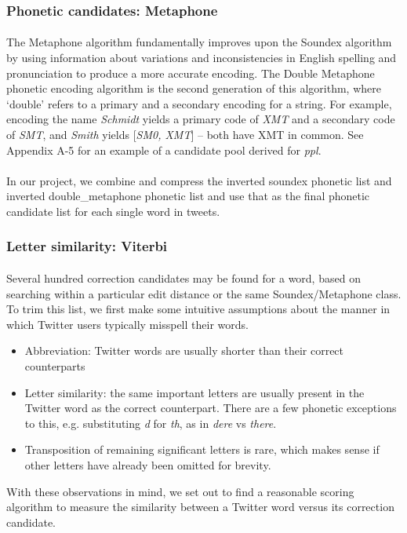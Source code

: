 \documentclass[twocolumn,10pt]{article}
\begin{document}
\subsubsection*{Phonetic candidates: Metaphone}
\paragraph{} The Metaphone algorithm fundamentally improves upon the Soundex algorithm by using information about variations and inconsistencies in English spelling and pronunciation to produce a more accurate encoding. The Double Metaphone phonetic encoding algorithm is the second generation of this algorithm, where `double' refers to a primary and a secondary encoding for a string. For example, encoding the name \textit{Schmidt} yields a primary code of \textit{XMT} and a secondary code of \textit{SMT}, and \textit{Smith}  yields [\textit{SM0, XMT}] -- both have XMT in common. See Appendix A-5 for an example of a candidate pool derived for \textit{ppl}.

\paragraph{} In our project, we combine and compress the inverted soundex phonetic list and inverted double\_metaphone phonetic list and use that as the final phonetic candidate list for each single word in tweets.
\subsubsection*{Letter similarity: Viterbi}
\paragraph{} Several hundred correction candidates may be found for a word, based on searching within a particular edit distance or the same Soundex/Metaphone class. To trim this list, we first make some intuitive assumptions about the manner in which Twitter users typically misspell their words.
\begin{itemize}
\item Abbreviation: Twitter words are usually shorter than their correct counterparts
\item Letter similarity: the same important letters are usually present in the Twitter word as the correct counterpart. There are a few phonetic exceptions to this, e.g. substituting \textit{d} for \textit{th}, as in \textit{dere} vs \textit{there}.
\item Transposition of remaining significant letters is rare, which makes sense if other letters have already been omitted for brevity.
\end{itemize}
With these observations in mind, we set out to find a reasonable scoring algorithm to measure the similarity between a Twitter word versus its correction candidate.
\end{document}
